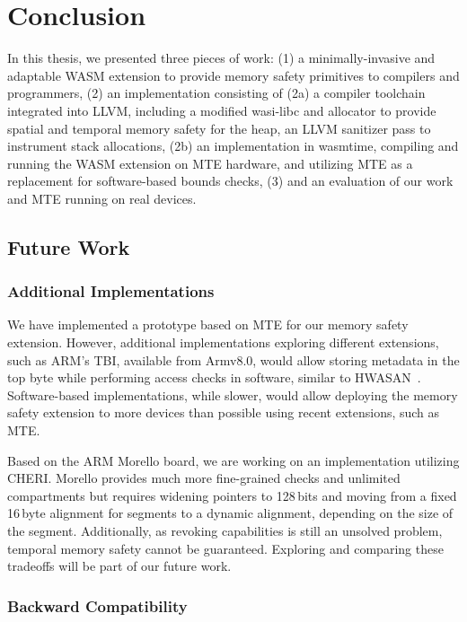 \chapter{Conclusion}
\label{ch:conclusion}

In this thesis, we presented three pieces of work:
(1) a minimally-invasive and adaptable \ac{WASM} extension to provide memory safety primitives to compilers and programmers,
(2) an implementation consisting of (2a) a compiler toolchain integrated into LLVM, including a modified wasi-libc and allocator to provide spatial and temporal memory safety for the heap, an LLVM sanitizer pass to instrument stack allocations,
(2b) an implementation in wasmtime, compiling and running the \ac{WASM} extension on \ac{MTE} hardware, and utilizing \ac{MTE} as a replacement for software-based bounds checks,
(3) and an evaluation of our work and \ac{MTE} running on real devices.

\section{Future Work}
\label{sec:future-work}

\subsection{Additional Implementations}
\label{subsec:additional-implementations}

We have implemented a prototype based on \ac{MTE} for our memory safety extension.
However, additional implementations exploring different extensions, such as ARM's \ac{TBI}, available from Armv8.0, would allow storing metadata in the top byte while performing access checks in software, similar to \ac{HWASAN}~\cite{serebryany2018memory}.
Software-based implementations, while slower, would allow deploying the memory safety extension to more devices than possible using recent extensions, such as \ac{MTE}.

Based on the ARM Morello board, we are working on an implementation utilizing \ac{CHERI}.
Morello provides much more fine-grained checks and unlimited compartments but requires widening pointers to 128\,bits and moving from a fixed 16\,byte alignment for segments to a dynamic alignment, depending on the size of the segment.
Additionally, as revoking capabilities is still an unsolved problem, temporal memory safety cannot be guaranteed.
Exploring and comparing these tradeoffs will be part of our future work.

\subsection{Backward Compatibility}
\label{subsec:backward-compatibility}

